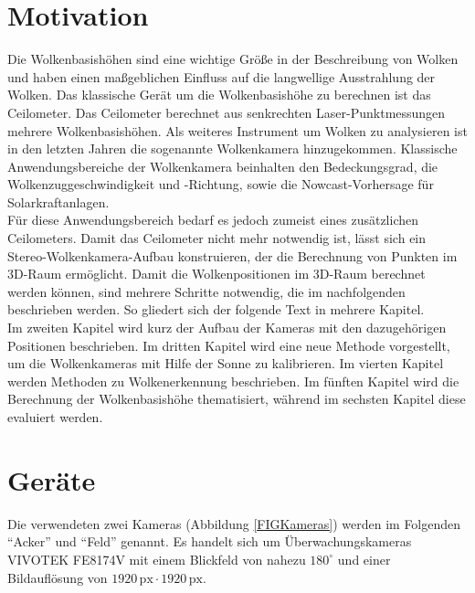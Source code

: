 \documentclass[a4paper,11pt,twoside,german]{article}
\newcommand{\absatz}{\smallbreak}
\begin{document}
\listoffigures %

\newpage


\section{Motivation}
Die Wolkenbasishöhen sind eine wichtige Größe in der Beschreibung von Wolken und haben einen maßgeblichen Einfluss auf die langwellige Ausstrahlung der Wolken. Das klassische Gerät um die Wolkenbasishöhe zu berechnen ist das Ceilometer. Das Ceilometer berechnet aus senkrechten Laser-Punktmessungen mehrere Wolkenbasishöhen. Als weiteres Instrument um Wolken zu analysieren ist in den letzten Jahren die sogenannte Wolkenkamera hinzugekommen. Klassische Anwendungsbereiche der Wolkenkamera beinhalten den Bedeckungsgrad, die Wolkenzuggeschwindigkeit und -Richtung, sowie die Nowcast-Vorhersage für Solarkraftanlagen.\\ Für diese Anwendungsbereich bedarf es jedoch zumeist eines zusätzlichen Ceilometers. Damit das Ceilometer nicht mehr notwendig ist, lässt sich ein Stereo-Wolkenkamera-Aufbau konstruieren, der die Berechnung von Punkten im 3D-Raum ermöglicht. Damit die Wolkenpositionen im 3D-Raum berechnet werden können, sind mehrere Schritte notwendig, die im nachfolgenden beschrieben werden. So gliedert sich der folgende Text in mehrere Kapitel.\\
Im zweiten Kapitel wird kurz der Aufbau der Kameras mit den dazugehörigen Positionen beschrieben. Im dritten Kapitel wird eine neue Methode vorgestellt, um die Wolkenkameras mit Hilfe der Sonne zu kalibrieren. Im vierten Kapitel werden Methoden zu Wolkenerkennung beschrieben. Im fünften Kapitel wird die Berechnung der Wolkenbasishöhe thematisiert, während im sechsten Kapitel diese evaluiert werden.


\section{Geräte}

Die verwendeten zwei Kameras (Abbildung \ref{FIGKameras}) werden im Folgenden
\enquote{Acker} und \enquote{Feld} genannt. Es handelt sich um
Überwachungskameras VIVOTEK FE8174V mit einem Blickfeld von nahezu $180^\circ$
und einer Bildauflösung von $1920\,\mathrm{px} \cdot 1920
\,\mathrm{px}$.
\absatz
\end{document}
